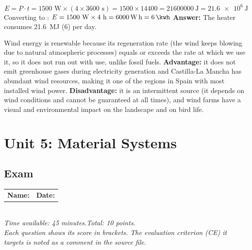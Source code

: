 \documentclass[11pt,a4paper]{article}
\newcommand{\examheader}[1]{%
\begin{center}
\begin{tabular}{ll}
\textbf{Name:} \makebox[6cm]{\dotfill} & \textbf{Date:} \makebox[3cm]{\dotfill} \\
\end{tabular}\\[4pt]
\textit{Time available: 45 minutes.\quad Total: 10 points.}\\[2pt]
\textit{Each question shows its score in brackets. The evaluation criterion (CE) it targets is noted as a comment in the source file.}
\end{center}
}
\begin{document}
\begin{solucioneng}
\[
E = P \cdot t = 1500 \text{ W} \times (4 \times 3600 \text{ s}) = 1500 \times 14400 = \qty{21600000}{\joule} = \qty{21.6e6}{\joule}
\]
Converting to \unit{\kwh}: $E = 1500 \text{ W} \times 4 \text{ h} = \qty{6000}{\watt\hour} = \qty{6}{\kwh}$
\textbf{Answer:} The heater consumes \qty{21.6}{\mega\joule} (\qty{6}{\kwh}) per day.
\end{solucioneng}

\begin{solucioneng}
Wind energy is renewable because its regeneration rate (the wind keeps blowing due to natural atmospheric processes) equals or exceeds the rate at which we use it, so it does not run out with use, unlike fossil fuels. \textbf{Advantage:} it does not emit greenhouse gases during electricity generation and Castilla-La Mancha has abundant wind resources, making it one of the regions in Spain with most installed wind power. \textbf{Disadvantage:} it is an intermittent source (it depends on wind conditions and cannot be guaranteed at all times), and wind farms have a visual and environmental impact on the landscape and on bird life.
\end{solucioneng}

\newpage
\section{Unit 5: Material Systems}
\subsection*{Exam}
\examheader{Unit 5}
\setcounter{preg}{1}



\end{document}
